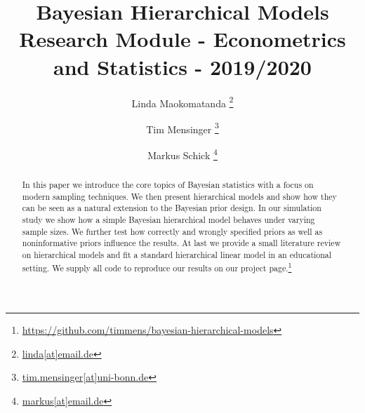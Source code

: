 \documentclass[a4paper,11.5pt]{article}
\title{\textbf{Bayesian Hierarchical Models}\\
\large Research Module - Econometrics and Statistics - 2019/2020
}
\date{}
\author{Linda Maokomatanda%
  \thanks{\href{mailto:linda@email.de}{linda[at]email.de}}}
\author{Tim Mensinger%
  \thanks{\href{mailto:tim.mensinger@uni-bonn.de}{tim.mensinger[at]uni-bonn.de}}}
\author{Markus Schick%
  \thanks{\href{mailto:markus.schick@uni-bonn.de}{markus[at]email.de}}}
\affil{University of Bonn}
\begin{document}
\setlength{\abovedisplayskip}{-20pt}
\setlength{\belowdisplayskip}{0pt}
\setlength{\abovedisplayshortskip}{0pt}
\setlength{\belowdisplayshortskip}{0pt}
\onehalfspacing

\thispagestyle{empty}
\maketitle
\begin{abstract}
  In this paper we introduce the core topics of Bayesian statistics with a focus on modern sampling techniques.
  We then present hierarchical models and show how they can be seen as a natural extension to the Bayesian prior design.
  In our simulation study we show how a simple Bayesian hierarchical model behaves under varying sample sizes. We further test how correctly and wrongly specified priors as well as noninformative priors influence the results.
  At last we provide a small literature review on hierarchical models and fit a standard hierarchical linear model in an educational setting. We supply all code to reproduce our results on our project page.\footnote{\url{https://github.com/timmens/bayesian-hierarchical-models}}
\end{abstract}

\newpage
\setcounter{tocdepth}{2}
\tableofcontents
\newpage

\pagestyle{plain}









\appendix

\end{document}
